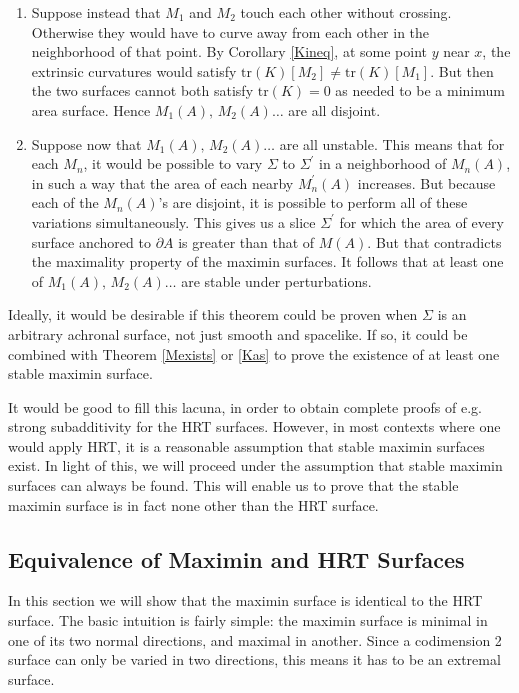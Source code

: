 \documentclass[12pt]{article}
\begin{document}
\begin{enumerate}[resume]
\begin{enumerate}
\begin{figure}[hbt]
\end{figure}
	\item Suppose instead that $M_1$ and $M_2$ touch each other without crossing.  Otherwise they would have to curve away from each other in the neighborhood of that point.  By Corollary \ref{Kineq}, at some point $y$ near $x$, the extrinsic curvatures would satisfy 
$\mathrm{tr}(K)[M_2] \ne \mathrm{tr}(K)[M_1]$.  But then the two surfaces cannot both satisfy $\mathrm{tr}(K) = 0$ as needed to be a minimum area surface.  Hence $M_1(A),\,M_2(A)\ldots$ are all disjoint.
	\item Suppose now that $M_1(A),\,M_2(A)\ldots$ are all unstable.  This means that for each $M_n$, it would be possible to vary $\Sigma$ to $\Sigma^\prime$ in a neighborhood of $M_n(A)$, in such a way that the area of each nearby $M_n^\prime(A)$ increases.  But because each of the $M_n(A)$'s are disjoint, it is possible to perform all of these variations simultaneously.  This gives us a slice $\Sigma^\prime$ for which the area of every surface anchored to $\partial A$ is greater than that of $M(A)$.  But that contradicts the maximality property of the maximin surfaces.  It follows that at least one of $M_1(A),\,M_2(A)\ldots$ are stable under perturbations.
	\end{enumerate}
\end{enumerate}
Ideally, it would be desirable if this theorem could be proven when $\Sigma$ is an arbitrary achronal surface, not just smooth and spacelike.  If so, it could be combined with Theorem \ref{Mexists} or \ref{Kas} to prove the existence of at least one stable maximin surface.  

It would be good to fill this lacuna, in order to obtain complete proofs of e.g. strong subadditivity for the HRT surfaces.  However, in most contexts where one would apply HRT, it is a reasonable assumption that stable maximin surfaces exist.  In light of this, we will proceed under the assumption that stable maximin surfaces can always be found.  This will enable us to prove that the stable maximin surface is in fact none other than the HRT surface.

\subsection{Equivalence of Maximin and HRT Surfaces}\label{equiv}

In this section we will show that the maximin surface is identical to the HRT surface.  The basic intuition is fairly simple: the maximin surface is minimal in one of its two normal directions, and maximal in another.  Since a codimension 2 surface can only be varied in two directions, this means it has to be an extremal surface.
\end{document}

